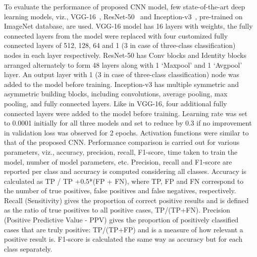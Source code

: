 \documentclass[10pt,journal,compsoc]{IEEEtran}
\begin{document}
To evaluate the performance of proposed CNN model, few state-of-the-art deep learning models, viz., VGG-16~\cite{simonyan2014very}, ResNet-50~\cite{he2016deep} and Inception-v3~\cite{szegedy2016rethinking}, pre-trained on ImageNet database, are used. VGG-16 model has 16 layers with weights, the fully connected layers from the model were replaced with four customized fully connected layers of 512, 128, 64 and 1 (3 in case of three-class classification) nodes in each layer respectively. ResNet-50 has Conv blocks and Identity blocks arranged alternately to form 48 layers along with 1 ‘Maxpool’ and 1 ‘Avgpool’ layer. An output layer with 1 (3 in case of three-class classification) node was added to the model before training. Inception-v3 has multiple symmetric and asymmetric building blocks, including convolutions, average pooling, max pooling, and fully connected layers. Like in VGG-16, four additional fully connected layers were added to the model before training. Learning rate was set to 0.0001 initially for all three models and set to reduce by 0.3 if no improvement in validation loss was observed for 2 epochs. Activation functions were similar to that of the proposed CNN. Performance comparison is carried out for various parameters, viz., accuracy, precision, recall, F1-score, time taken to train the model, number of model parameters, etc. Precision, recall and F1-score are reported per class and accuracy is computed considering all classes. Accuracy is calculated as TP / TP +0.5*(FP + FN), where TP, FP and FN correspond to the number of true positives, false positives and false negatives, respectively. Recall (Sensitivity) gives the proportion of correct positive results and is defined as the ratio of true positives to all positive cases, TP/(TP+FN). Precision (Positive Predictive Value - PPV) gives the proportion of positively classified cases that are truly positive: TP/(TP+FP) and is a measure of how relevant a positive result is. F1-score is calculated the same way as accuracy but for each class separately.
\end{document}
